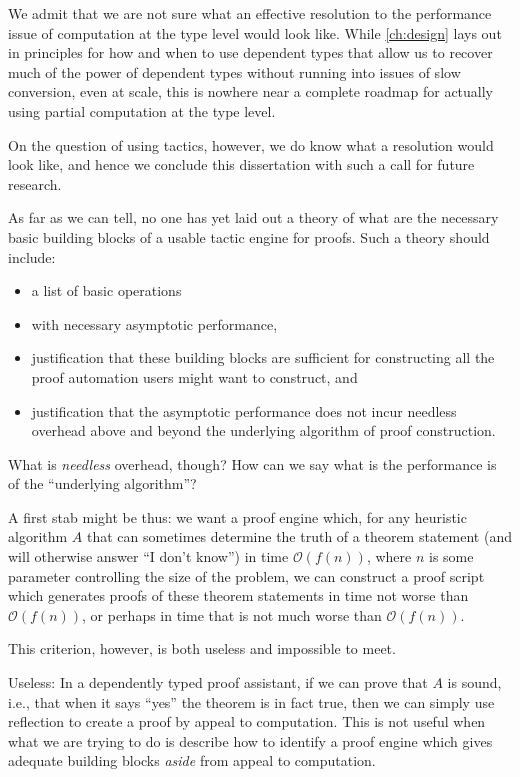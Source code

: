 We admit that we are not sure what an effective resolution to the performance issue of computation at the type level would look like.
While \autoref{ch:design} lays out in  principles for how and when to use dependent types that allow us to recover much of the power of dependent types without running into issues of slow conversion, even at scale, this is nowhere near a complete roadmap for actually using partial computation at the type level.

On the question of using tactics, however, we do know what a resolution would look like, and hence we conclude this dissertation with such a call for future research.

As far as we can tell, no one has yet laid out a theory of what are the necessary basic building blocks of a usable tactic engine for proofs.
Such a theory should include:
\begin{itemize}
\item
  a list of basic operations
\item
  with necessary asymptotic performance,
\item
  justification that these building blocks are sufficient for constructing all the proof automation users might want to construct, and
\item
  justification that the asymptotic performance does not incur needless overhead above and beyond the underlying algorithm of proof construction.
\end{itemize}

What is \emph{needless} overhead, though?
How can we say what is the performance is of the ``underlying algorithm''?

A first stab might be thus: we want a proof engine which, for any heuristic algorithm $A$ that can sometimes determine the truth of a theorem statement (and will otherwise answer ``I don't know'') in time $\mathcal O(f(n))$, where $n$ is some parameter controlling the size of the problem, we can construct a proof script which generates proofs of these theorem statements in time not worse than $\mathcal O(f(n))$, or perhaps in time that is not much worse than $\mathcal O(f(n))$.

This criterion, however, is both useless and impossible to meet.

Useless:
In a dependently typed proof assistant, if we can prove that $A$ is sound, i.e., that when it says ``yes'' the theorem is in fact true, then we can simply use reflection to create a proof by appeal to computation.
This is not useful when what we are trying to do is describe how to identify a proof engine which gives adequate building blocks \emph{aside} from appeal to computation.

